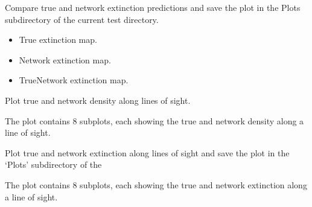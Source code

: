 \documentclass[letterpaper,10pt,english]{sphinxmanual}
\begin{document}
\begin{fulllineitems}
\begin{fulllineitems}
\label{\detokenize{Visualizer:Visualizer.Visualizer.compare_extinctions}}
\pysigstartsignatures
{}
\pysigstopsignatures
\sphinxAtStartPar
Compare true and network extinction predictions and save the plot in the Plots subdirectory
of the current test directory.
\begin{description}
\begin{itemize}
\item {} 
\sphinxAtStartPar
True extinction map.

\item {} 
\sphinxAtStartPar
Network extinction map.

\item {} 
\sphinxAtStartPar
True\sphinxhyphen{}Network extinction map.

\end{itemize}

\end{description}

\end{fulllineitems}


\begin{fulllineitems}
\label{\detokenize{Visualizer:Visualizer.Visualizer.density_vs_distance}}
\pysigstartsignatures
{}
\pysigstopsignatures
\sphinxAtStartPar
Plot true and network density along lines of sight.
\begin{description}
\sphinxAtStartPar
The plot contains 8 subplots, each showing the true and network density along a line of sight.

\end{description}

\end{fulllineitems}


\begin{fulllineitems}
\label{\detokenize{Visualizer:Visualizer.Visualizer.extinction_vs_distance}}
\pysigstartsignatures
{}
\pysigstopsignatures
\sphinxAtStartPar
Plot true and network extinction along lines of sight and save the plot in the ‘Plots’ subdirectory of the
\begin{description}
\sphinxAtStartPar
The plot contains 8 subplots, each showing the true and network extinction along a line of sight.


\end{description}
\end{fulllineitems}
\end{fulllineitems}
\end{document}
